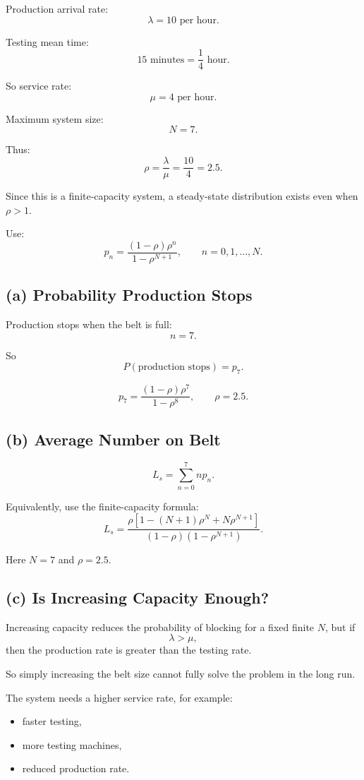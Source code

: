 \documentclass[12pt]{article}
\begin{document}
Production arrival rate:
\[
\lambda=10\text{ per hour}.
\]

Testing mean time:
\[
15\text{ minutes}=\frac14\text{ hour}.
\]

So service rate:
\[
\mu=4\text{ per hour}.
\]

Maximum system size:
\[
N=7.
\]

Thus:
\[
\rho=\frac{\lambda}{\mu}=\frac{10}{4}=2.5.
\]

Since this is a finite-capacity system, a steady-state distribution exists even when \(\rho>1\).

Use:
\[
p_n=\frac{(1-\rho)\rho^n}{1-\rho^{N+1}},
\qquad n=0,1,\ldots,N.
\]

\subsection*{(a) Probability Production Stops}

Production stops when the belt is full:
\[
n=7.
\]

So
\[
P(\text{production stops})=p_7.
\]

\[
\boxed{
p_7=
\frac{(1-\rho)\rho^7}{1-\rho^8},
\qquad \rho=2.5.
}
\]

\subsection*{(b) Average Number on Belt}

\[
\boxed{
L_s=
\sum_{n=0}^{7}np_n.
}
\]

Equivalently, use the finite-capacity formula:
\[
L_s=
\frac{\rho\left[1-(N+1)\rho^N+N\rho^{N+1}\right]}
{(1-\rho)(1-\rho^{N+1})}.
\]

Here \(N=7\) and \(\rho=2.5\).

\subsection*{(c) Is Increasing Capacity Enough?}

Increasing capacity reduces the probability of blocking for a fixed finite \(N\), but if
\[
\lambda>\mu,
\]
then the production rate is greater than the testing rate.

So simply increasing the belt size cannot fully solve the problem in the long run.

The system needs a higher service rate, for example:
\begin{itemize}
    \item faster testing,
    \item more testing machines,
    \item reduced production rate.
\end{itemize}
\end{document}
